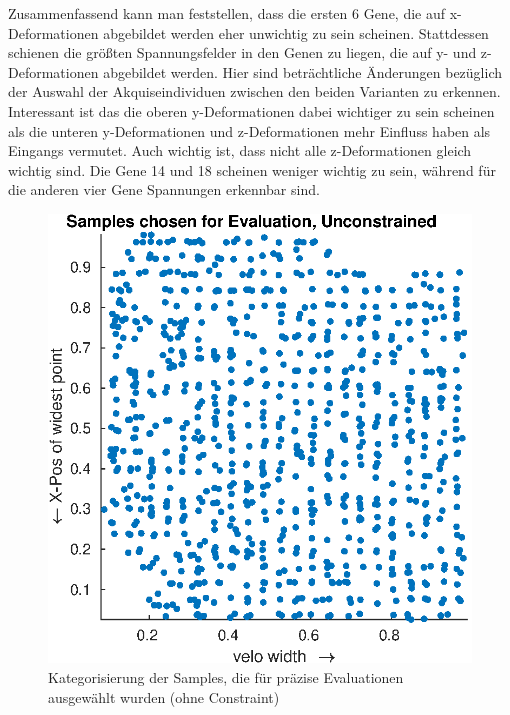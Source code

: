 Zusammenfassend kann man feststellen, dass die ersten 6 Gene, die auf x-Deformationen abgebildet werden eher unwichtig zu sein scheinen.
Stattdessen schienen die größten Spannungsfelder in den Genen zu liegen, die auf y- und z-Deformationen abgebildet werden.
Hier sind beträchtliche Änderungen bezüglich der Auswahl der Akquiseindividuen zwischen den beiden Varianten zu erkennen.
Interessant ist das die oberen y-Deformationen dabei wichtiger zu sein scheinen als die unteren y-Deformationen und z-Deformationen mehr Einfluss haben als Eingangs vermutet.
Auch wichtig ist, dass nicht alle z-Deformationen gleich wichtig sind.
Die Gene 14 und 18 scheinen weniger wichtig zu sein, während für die anderen vier Gene Spannungen erkennbar sind.

\begin{figure}[h]
	\centering
	\begin{minipage}{0.45\textwidth}
		\centering
		\includegraphics[width=1\linewidth]{bilder/6pt1000Samples/acqSamplesUncon}
		\caption{Kategorisierung der Samples, die für präzise Evaluationen ausgewählt wurden (ohne Constraint)}
		\label{fig:acqSamplesUncon}
	\end{minipage}\hfill
	\begin{minipage}{0.45\textwidth}
		\centering

\end{minipage}
\end{figure}
